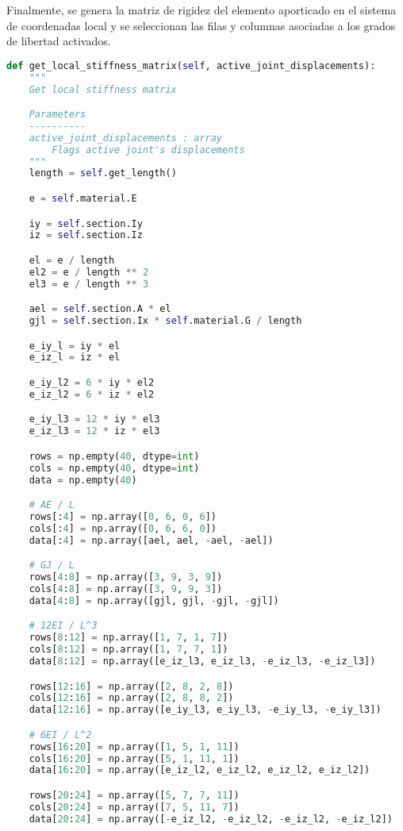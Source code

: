 Finalmente, se genera la matriz de rigidez del elemento aporticado en el sistema de coordenadas local y se seleccionan las filas y columnas asociadas a los grados de libertad activados.\\

\begin{lstlisting}[language=Python,caption=Método \texttt{get\_local\_stiffness\_matrix()} de la clase \texttt{Frame}.,label=alg:Frame-get_local_stiffness_matrix, frame=single]
def get_local_stiffness_matrix(self, active_joint_displacements):
    """
    Get local stiffness matrix

    Parameters
    ----------
    active_joint_displacements : array
        Flags active joint's displacements
    """
    length = self.get_length()

    e = self.material.E

    iy = self.section.Iy
    iz = self.section.Iz

    el = e / length
    el2 = e / length ** 2
    el3 = e / length ** 3

    ael = self.section.A * el
    gjl = self.section.Ix * self.material.G / length

    e_iy_l = iy * el
    e_iz_l = iz * el

    e_iy_l2 = 6 * iy * el2
    e_iz_l2 = 6 * iz * el2

    e_iy_l3 = 12 * iy * el3
    e_iz_l3 = 12 * iz * el3

    rows = np.empty(40, dtype=int)
    cols = np.empty(40, dtype=int)
    data = np.empty(40)

    # AE / L
    rows[:4] = np.array([0, 6, 0, 6])
    cols[:4] = np.array([0, 6, 6, 0])
    data[:4] = np.array([ael, ael, -ael, -ael])

    # GJ / L
    rows[4:8] = np.array([3, 9, 3, 9])
    cols[4:8] = np.array([3, 9, 9, 3])
    data[4:8] = np.array([gjl, gjl, -gjl, -gjl])

    # 12EI / L^3
    rows[8:12] = np.array([1, 7, 1, 7])
    cols[8:12] = np.array([1, 7, 7, 1])
    data[8:12] = np.array([e_iz_l3, e_iz_l3, -e_iz_l3, -e_iz_l3])

    rows[12:16] = np.array([2, 8, 2, 8])
    cols[12:16] = np.array([2, 8, 8, 2])
    data[12:16] = np.array([e_iy_l3, e_iy_l3, -e_iy_l3, -e_iy_l3])

    # 6EI / L^2
    rows[16:20] = np.array([1, 5, 1, 11])
    cols[16:20] = np.array([5, 1, 11, 1])
    data[16:20] = np.array([e_iz_l2, e_iz_l2, e_iz_l2, e_iz_l2])

    rows[20:24] = np.array([5, 7, 7, 11])
    cols[20:24] = np.array([7, 5, 11, 7])
    data[20:24] = np.array([-e_iz_l2, -e_iz_l2, -e_iz_l2, -e_iz_l2])


\end{lstlisting}
